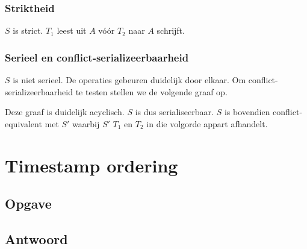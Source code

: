 \documentclass[transacties.tex]{subfiles}
\begin{document}
\subsubsection*{Striktheid}
$S$ is strict. $T_1$ leest uit $A$ v\'o\'or $T_2$ naar $A$ schrijft.

\subsubsection*{Serieel en conflict-serializeerbaarheid}
$S$ is niet serieel. De operaties gebeuren duidelijk door elkaar.
Om conflict-serializeerbaarheid te testen stellen we de volgende graaf op.
\begin{figure}[H]
\centering
{}
\end{figure}
Deze graaf is duidelijk acyclisch. $S$ is dus serialiseerbaar. $S$ is bovendien conflict-equivalent met $S'$ waarbij $S'$ $T_1$ en $T_2$ in die volgorde appart afhandelt.

\section{Timestamp ordering}
\subsection*{Opgave}

\subsection*{Antwoord}
\end{document}
